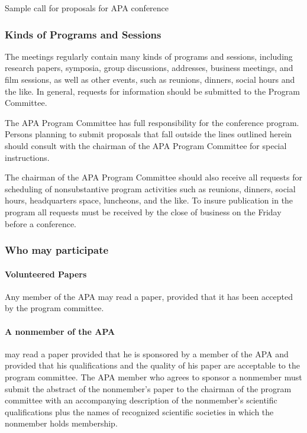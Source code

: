 \begin{refsection}
\begin{apatextbox}{Sample call for proposals for APA conference}
\subsubsection{Kinds of Programs and Sessions}
\label{kindsofprogramsandsessions}

The meetings regularly contain many kinds of programs and sessions, including research papers, symposia, group discussions, addresses, business meetings, and film sessions, as well as other events, such as reunions, dinners, social hours and the like. In general, requests for information should be submitted to the Program Committee.

The APA Program Committee has full responsibility for the conference program. Persons planning to submit proposals that fall outside the lines outlined herein should consult with the chairman of the APA Program Committee for special instructions.

The chairman of the APA Program Committee should also receive all requests for scheduling of nonsubstantive program activities such as reunions, dinners, social hours, headquarters space, luncheons, and the like. To insure publication in the program all requests must be received by the close of business on the Friday before a conference.

\subsubsection{Who may participate}
\label{whomayparticipate}

\paragraph{Volunteered Papers}
\label{volunteeredpapers}

Any member of the APA may read a paper, provided that it has been accepted by the program committee.

\paragraph{A nonmember of the APA}
\label{anonmemberoftheapa}

may read a paper provided that he is sponsored by a member of the APA and provided that his qualifications and the quality of his paper are acceptable to the program committee. The APA member who agrees to sponsor a nonmember must submit the abstract of the nonmember's paper to the chairman of the program committee with an accompanying description of the nonmember's scientific qualifications plus the names of recognized scientific societies in which the nonmember holds membership.


\end{apatextbox}
\end{refsection}
